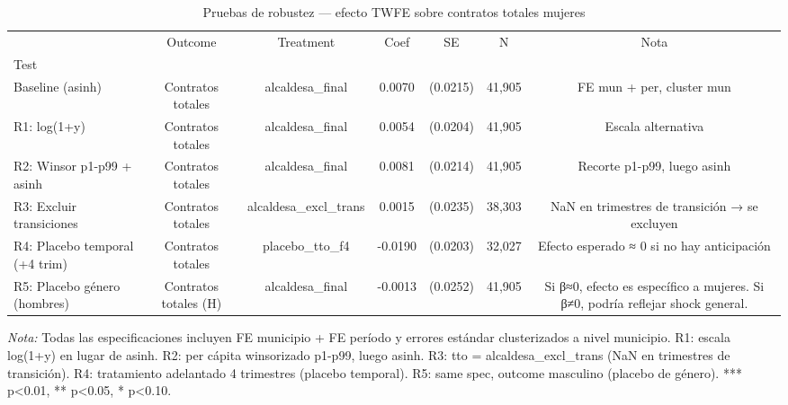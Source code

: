 \begin{table}[htbp]
\centering
\small
\caption{Pruebas de robustez — efecto TWFE sobre contratos totales mujeres}
\label{tab:robustness}
\begin{tabular}{lcccccc}
\toprule
 & Outcome & Treatment & Coef & SE & N & Nota \\
Test &  &  &  &  &  &  \\
\midrule
Baseline (asinh) & Contratos totales & alcaldesa\_final & 0.0070 & (0.0215) & 41,905 & FE mun + per, cluster mun \\
R1: log(1+y) & Contratos totales & alcaldesa\_final & 0.0054 & (0.0204) & 41,905 & Escala alternativa \\
R2: Winsor p1-p99 + asinh & Contratos totales & alcaldesa\_final & 0.0081 & (0.0214) & 41,905 & Recorte p1-p99, luego asinh \\
R3: Excluir transiciones & Contratos totales & alcaldesa\_excl\_trans & 0.0015 & (0.0235) & 38,303 & NaN en trimestres de transición → se excluyen \\
R4: Placebo temporal (+4 trim) & Contratos totales & placebo\_tto\_f4 & -0.0190 & (0.0203) & 32,027 & Efecto esperado ≈ 0 si no hay anticipación \\
R5: Placebo género (hombres) & Contratos totales (H) & alcaldesa\_final & -0.0013 & (0.0252) & 41,905 & Si β≈0, efecto es específico a mujeres. Si β≠0, podría reflejar shock general. \\
\bottomrule
\end{tabular}
\vspace{2mm}
\parbox{\textwidth}{\footnotesize \textit{Nota:} Todas las especificaciones incluyen FE municipio + FE período y errores estándar clusterizados a nivel municipio. R1: escala log(1+y) en lugar de asinh. R2: per cápita winsorizado p1-p99, luego asinh. R3: tto = alcaldesa\_excl\_trans (NaN en trimestres de transición). R4: tratamiento adelantado 4 trimestres (placebo temporal). R5: same spec, outcome masculino (placebo de género). *** p<0.01, ** p<0.05, * p<0.10.}
\end{table}